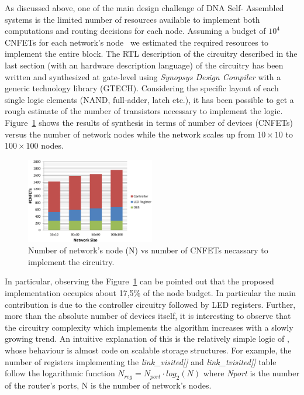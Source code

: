 As discussed above, one of the main design challenge of DNA Self-
Assembled systems is the limited number of resources available to implement both
computations and routing decisions for each node. Assuming a budget of
$10^4$ CNFETs for each network's node~\cite{liu_jetcs}  we estimated
the required resources to implement the entire \disr{} block. The RTL
description of the circuitry described in the last section (with an
hardware description language)  of the \disr{} circuitry has been written
and synthesized at gate-level using \emph{Synopsys Design Compiler} with 
a generic technology library (GTECH).
Considering the specific layout of each single logic elements  (NAND,
full-adder, latch etc.), it has been possible to get a rough estimate
of the number of transistors necessary to implement the \disr{} logic.
Figure~\ref{fig:synthesys} shows the results of synthesis in terms of
number of devices (CNFETs) versus the number of network nodes while
the network scales up from $10\times10$ to $100\times100$ nodes.

\begin{figure}
  \centering
  \includegraphics[width=0.50\textwidth]{pictures/synthesis.eps}
  \caption{Number of network's node (N) vs number of CNFETs necassary to implement
  the \disr{} circuitry.}
 \label{fig:synthesys}
\end{figure}

In particular, observing the Figure~\ref{fig:synthesys} can  be
pointed out that the proposed implementation occupies about 17,5\% of
the node budget. In particular the main contribution is due to the
controller circuitry followed by LED registers. Further, more than the
absolute number of devices itself, it is interesting to observe that
the circuitry complexity which implements the \disr{} algorithm increases
with a slowly growing trend.   An intuitive explanation of this is the
relatively simple logic of \disr{}, whose behaviour is almost code on
scalable storage structures. For example, the number of registers
implementing the \emph{link\_visited[]} and \emph{link\_tvisited[]}
table follow the logarithmic function $N_{reg}=N_{port} \cdot
log_2(N)$ where \emph{Nport} is the number of the router’s ports, N is
the number of network’s nodes.

